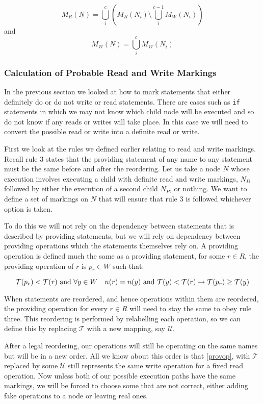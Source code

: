 \documentclass[twoside,a4paper]{report}
\begin{document}
$$M_R(N) = \bigcup_i^c (M_R(N_i) \setminus \bigcup_i^{c-1} M_W(N_i))$$
and
$$M_W(N) = \bigcup_i^c M_W(N_i)$$

\subsubsection{Calculation of Probable Read and Write Markings}

In the previous section we looked at how to mark statements that either definitely do or do not write or read statements. There are cases such as
\texttt{if} statements in which we may not know which child node will be executed and so do not know if any reads or writes will take place. In this
case we will need to convert the possible read or write into a definite read or write.

First we look at the rules we defined earlier relating to read and write markings. Recall rule 3 states that the providing statement of
any name to any statement must be the same before and after the reordering. Let us take a node $N$ whose execution involves executing a
child with definite read and write markings, $N_D$ followed by either the execution of a second child $N_P$, or nothing. We want to define
a set of markings on $N$ that will ensure that rule 3 is followed whichever option is taken.

To do this we will not rely on the dependency between statements that is described by providing statements, but we will rely on dependency
between providing operations which the statements themselves rely on. A providing operation is defined much the same as a providing statement,
for some $r \in R$, the providing operation of $r$ is $p_r \in W$ such that:

\begin{equation} \label{provop}
\mathcal{T}(p_r) < \mathcal{T}(r) \text{ and } \\
\forall y \in W \quad n(r) = n(y) \text{ and } \mathcal{T}(y) < \mathcal{T}(r) \rightarrow \mathcal{T}(p_r) \ge \mathcal{T}(y)
\end{equation}

When statements are reordered, and hence operations within them are reordered, the providing operation for every $r \in R$ will need to stay the same to
obey rule three. This reordering is performed by relabelling each operation, so we can define this by replacing $\mathcal{T}$ with a new mapping, say
$\mathcal{U}$.

After a legal reordering, our operations will still be operating on the same names but will be in a new order. All we know about this order is that
\eqref{provop}, with $\mathcal{T}$ replaced by some $\mathcal{U}$ still represents the same write operation for a fixed read operation. Now unless
both of our possible execution paths have the same markings, we will be forced to choose some that are not correct, either adding fake operations
to a node or leaving real ones.
\end{document}
